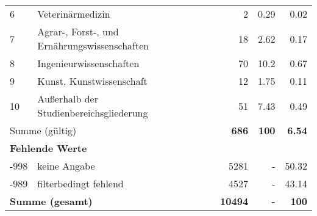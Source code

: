 \begin{longtable}{lXrrr}
     6 &
     \multicolumn{1}{X}{ Veterinärmedizin   } &


       \num{2} &
       \num[round-mode=places,round-precision=2]{0,29} &
         \num[round-mode=places,round-precision=2]{0,02} \\

     7 &
     \multicolumn{1}{X}{ Agrar-, Forst-, und Ernährungswissenschaften   } &


       \num{18} &
       \num[round-mode=places,round-precision=2]{2,62} &
         \num[round-mode=places,round-precision=2]{0,17} \\

     8 &
     \multicolumn{1}{X}{ Ingenieurwissenschaften   } &


       \num{70} &
       \num[round-mode=places,round-precision=2]{10,2} &
         \num[round-mode=places,round-precision=2]{0,67} \\

     9 &
     \multicolumn{1}{X}{ Kunst, Kunstwissenschaft   } &


       \num{12} &
       \num[round-mode=places,round-precision=2]{1,75} &
         \num[round-mode=places,round-precision=2]{0,11} \\

     10 &
     \multicolumn{1}{X}{ Außerhalb der Studienbereichsgliederung   } &


       \num{51} &
       \num[round-mode=places,round-precision=2]{7,43} &
         \num[round-mode=places,round-precision=2]{0,49} \\
     \midrule
     \multicolumn{2}{l}{Summe (gültig)} &
       \textbf{\num{686}} &
     \textbf{100} &
       \textbf{\num[round-mode=places,round-precision=2]{6,54}} \\
     \multicolumn{5}{l}{\textbf{Fehlende Werte}}\\
       -998 &
       keine Angabe &
         \num{5281} &
        - &
         \num[round-mode=places,round-precision=2]{50,32} \\
       -989 &
       filterbedingt fehlend &
         \num{4527} &
        - &
         \num[round-mode=places,round-precision=2]{43,14} \\
     \midrule
     \multicolumn{2}{l}{\textbf{Summe (gesamt)}} &
          \textbf{\num{10494}} &
        \textbf{-} &
        \textbf{100} \\
     \bottomrule
     \end{longtable}
     
